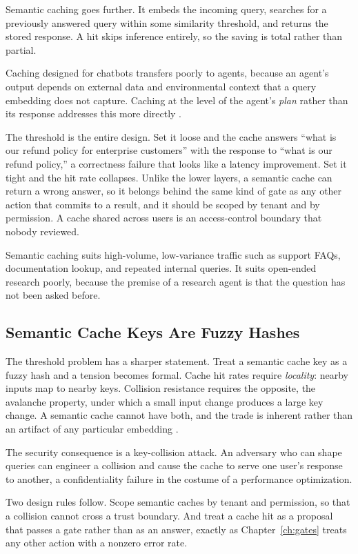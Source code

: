 \documentclass[11pt]{book}
\begin{document}
Semantic caching goes further. It embeds the incoming query, searches for a previously answered query within some similarity threshold, and returns the stored response. A hit skips inference entirely, so the saving is total rather than partial.

Caching designed for chatbots transfers poorly to agents, because an agent's output depends on external data and environmental context that a query embedding does not capture. Caching at the level of the agent's \textit{plan} rather than its response addresses this more directly \cite{plancache2025}.

The threshold is the entire design. Set it loose and the cache answers ``what is our refund policy for enterprise customers'' with the response to ``what is our refund policy,'' a correctness failure that looks like a latency improvement. Set it tight and the hit rate collapses. Unlike the lower layers, a semantic cache can return a wrong answer, so it belongs behind the same kind of gate as any other action that commits to a result, and it should be scoped by tenant and by permission. A cache shared across users is an access-control boundary that nobody reviewed.

Semantic caching suits high-volume, low-variance traffic such as support FAQs, documentation lookup, and repeated internal queries. It suits open-ended research poorly, because the premise of a research agent is that the question has not been asked before.

\subsection{Semantic Cache Keys Are Fuzzy Hashes}

The threshold problem has a sharper statement. Treat a semantic cache key as a fuzzy hash and a tension becomes formal. Cache hit rates require \emph{locality}: nearby inputs map to nearby keys. Collision resistance requires the opposite, the avalanche property, under which a small input change produces a large key change. A semantic cache cannot have both, and the trade is inherent rather than an artifact of any particular embedding \cite{cachecollision2026}.

The security consequence is a key-collision attack. An adversary who can shape queries can engineer a collision and cause the cache to serve one user's response to another, a confidentiality failure in the costume of a performance optimization.

Two design rules follow. Scope semantic caches by tenant and permission, so that a collision cannot cross a trust boundary. And treat a cache hit as a proposal that passes a gate rather than as an answer, exactly as Chapter~\ref{ch:gates} treats any other action with a nonzero error rate.
\end{document}
